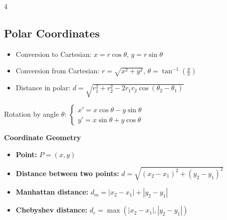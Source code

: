 \begin{multicols*}{4}
\subsection*{Polar Coordinates}
\begin{itemize}
    \item Conversion to Cartesian: $x = r\cos\theta$, $y = r\sin\theta$
    \item Conversion from Cartesian: $r = \sqrt{x^2 + y^2}$, $\theta = \tan^{-1}\left(\frac{y}{x}\right)$
    \item Distance in polar: $d = \sqrt{r_1^2 + r_2^2 - 2r_1r_2\cos(\theta_2 - \theta_1)}$
\end{itemize}

Rotation by angle $\theta$:
    $\begin{cases}
    x' = x\cos\theta - y\sin\theta\\
    y' = x\sin\theta + y\cos\theta
    \end{cases}$
    

\newcommand{\point}[2]{(#1, #2)}
\newcommand{\dist}[2]{\sqrt{(#1)^2 + (#2)^2}}
\newcommand{\manhattan}[2]{|#1| + |#2|}
\newcommand{\chebyshev}[2]{\max(|#1|, |#2|)}

\newcommand{\slope}[4]{\frac{#4 - #2}{#3 - #1}}
\newcommand{\lineeq}[4]{y - #2 = \frac{#4 - #2}{#3 - #1}(x - #1)}
\newcommand{\lineeqgen}{ax + by + c = 0}
\newcommand{\distancepointline}[5]{%
  \frac{\left|#1#4 + #2#5 + #3\right|}{\sqrt{#1^{2} + #2^{2}}}%
}

\newcommand{\vecmagnitude}[2]{\sqrt{#1^2 + #2^2}}
\newcommand{\dotproduct}[4]{#1\cdot#3 + #2\cdot#4}
\newcommand{\crossproduct}[4]{#1\cdot#4 - #2\cdot#3}

\newcommand{\ccw}[6]{(#3 - #1)*(#6 - #2) - (#5 - #2)*(#4 - #1)} %
\newcommand{\online}[6]{\ccw{#1}{#2}{#3}{#4}{#5}{#6} == 0} %
\newcommand{\onsegment}[6]{\online{#1}{#2}{#3}{#4}{#5}{#6} \land \min(#1,#3) \leq #5 \leq \max(#1,#3) \land \min(#2,#4) \leq #6 \leq \max(#2,#4)}


\textbf{\newline Coordinate Geometry } 
\begin{itemize}
    \item \textbf{Point:} $P = \point{x}{y}$
    \item \textbf{Distance between two points:} $d = \sqrt{(x_2-x_1)^2 + (y_2-y_1)^2}$
    \item \textbf{Manhattan distance:} $d_m = |x_2-x_1| + |y_2-y_1|$
    \item \textbf{Chebyshev distance:} $d_c = \max(|x_2-x_1|, |y_2-y_1|)$
\end{itemize}


\end{multicols*}
